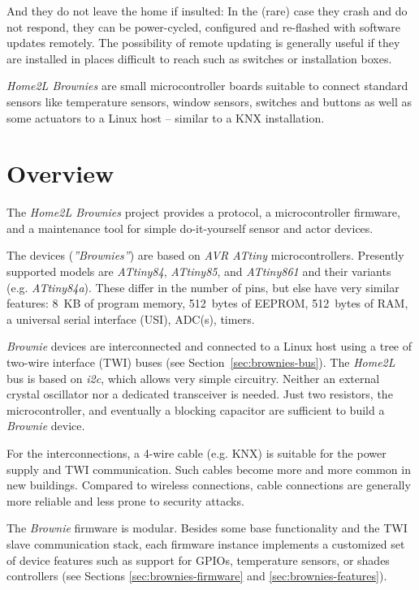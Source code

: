 \documentclass[12pt,english,parskip=half,headheight=19pt]{scrreprt}
\begin{document}
And they do not leave the home if insulted: In the (rare) case they crash and do not respond, they can be power-cycled, configured and re-flashed with software updates remotely. The possibility of remote updating is generally useful if they are installed in places difficult to reach such as switches or installation boxes.

\textit{Home2L Brownies} are small microcontroller boards suitable to connect standard sensors like temperature sensors, window sensors, switches and buttons as well as some actuators to a Linux host -- similar to a KNX installation.





\section{Overview}
\label{sec:brownies-overview}


The \textit{Home2L Brownies} project provides a protocol, a microcontroller firmware, and a maintenance tool for simple do-it-yourself sensor and actor devices.

The devices (\textit{''Brownies''}) are based on \textit{AVR ATtiny} microcontrollers. Presently supported models are \textit{ATtiny84}, \textit{ATtiny85}, and \textit{ATtiny861} and their variants (e.g. \textit{ATtiny84a}). These differ in the number of pins, but else have very similar features: 8~KB of program memory, 512~bytes of EEPROM, 512~bytes of RAM, a universal serial interface (USI), ADC(s), timers.

\textit{Brownie} devices are interconnected and connected to a Linux host using a tree of two-wire interface (TWI) buses (see Section~\ref{sec:brownies-bus}). The \textit{Home2L} bus is based on \textit{i2c}, which allows very simple circuitry. Neither an external crystal oscillator nor a dedicated transceiver is needed. Just two resistors, the microcontroller, and eventually a blocking capacitor are sufficient to build a \textit{Brownie} device.

For the interconnections, a 4-wire cable (e.g. KNX) is suitable for the power supply and TWI communication. Such cables become more and more common in new buildings. Compared to wireless connections, cable connections are generally more reliable and less prone to security attacks.

The \textit{Brownie} firmware is modular. Besides some base functionality and the TWI slave communication stack, each firmware instance implements a customized set of device features such as support for GPIOs, temperature sensors, or shades controllers (see Sections \ref{sec:brownies-firmware} and \ref{sec:brownies-features}).
\end{document}
